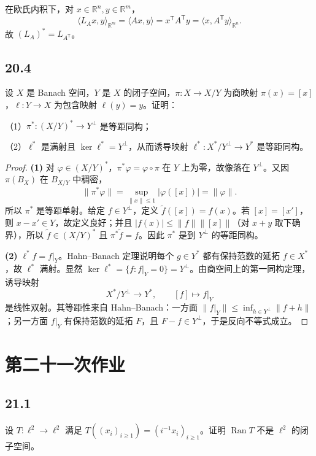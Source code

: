 在欧氏内积下，对 $x\in\mathbb R^n,y\in\mathbb R^m$，
\[
 \langle L_Ax,y\rangle_{\mathbb R^m}=\langle Ax,y\rangle
 =x^{\mathsf T}A^{\mathsf T}y
 =\langle x,A^{\mathsf T}y\rangle_{\mathbb R^n}.
\]
故 $(L_A)^*=L_{A^{\mathsf T}}$。

\subsection*{20.4}
\begin{problem}
设 $X$ 是 Banach 空间，$Y$ 是 $X$ 的闭子空间，$\pi:X\to X/Y$ 为商映射
$\pi(x)=[x]$，$\ell:Y\to X$ 为包含映射 $\ell(y)=y$。证明：

（1）$\pi^*:(X/Y)^*\to Y^\perp$ 是等距同构；

（2）$\ell^*$ 是满射且 $\ker\ell^*=Y^\perp$，从而诱导映射
$\ell^*:X^*/Y^\perp\to Y^*$ 是等距同构。
\end{problem}

\begin{proof}
\textbf{(1)} 对 $\varphi\in(X/Y)^*$，$\pi^*\varphi=\varphi\circ\pi$ 在 $Y$ 上为零，故像落在
$Y^\perp$。又因 $\pi(B_X)$ 在 $B_{X/Y}$ 中稠密，
\[
 \|\pi^*\varphi\|=\sup_{\|x\|\leq1}|\varphi([x])|=\|\varphi\|.
\]
所以 $\pi^*$ 是等距单射。给定 $f\in Y^\perp$，定义
$\widetilde f([x])=f(x)$。若 $[x]=[x']$，则 $x-x'\in Y$，故定义良好；并且
$|f(x)|\leq\|f\|\|[x]\|$（对 $x+y$ 取下确界），所以 $\widetilde f\in(X/Y)^*$ 且
$\pi^*\widetilde f=f$。因此 $\pi^*$ 是到 $Y^\perp$ 的等距同构。

\textbf{(2)} $\ell^*f=f|_Y$。Hahn--Banach 定理说明每个 $g\in Y^*$ 都有保持范数的延拓
$f\in X^*$，故 $\ell^*$ 满射。显然
$\ker\ell^*=\{f:f|_Y=0\}=Y^\perp$。由商空间上的第一同构定理，诱导映射
\[
 X^*/Y^\perp\longrightarrow Y^*,\qquad[f]\longmapsto f|_Y
\]
是线性双射。其等距性来自 Hahn--Banach：一方面
$\|f|_Y\|\leq\inf_{h\in Y^\perp}\|f+h\|$；另一方面 $f|_Y$ 有保持范数的延拓 $F$，且
$F-f\in Y^\perp$，于是反向不等式成立。
\end{proof}

\section{第二十一次作业}

\subsection*{21.1}
\begin{problem}
设 $T:\ell^2\to\ell^2$ 满足
$T((x_i)_{i\geq1})=(i^{-1}x_i)_{i\geq1}$。证明 $\operatorname{Ran}T$ 不是
$\ell^2$ 的闭子空间。
\end{problem}

